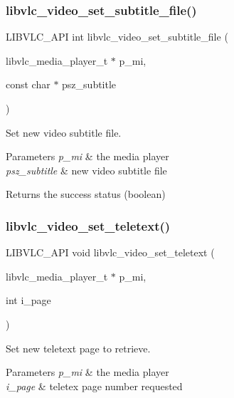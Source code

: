 \subsubsection{\texorpdfstring{libvlc\+\_\+video\+\_\+set\+\_\+subtitle\+\_\+file()}{libvlc\_video\_set\_subtitle\_file()}}
{\footnotesize\ttfamily L\+I\+B\+V\+L\+C\+\_\+\+A\+PI int libvlc\+\_\+video\+\_\+set\+\_\+subtitle\+\_\+file (\begin{DoxyParamCaption}\item[{libvlc\+\_\+media\+\_\+player\+\_\+t $\ast$}]{p\+\_\+mi,  }\item[{const char $\ast$}]{psz\+\_\+subtitle }\end{DoxyParamCaption})}

Set new video subtitle file.


\begin{DoxyParams}{Parameters}
{\em p\+\_\+mi} & the media player \\
\hline
{\em psz\+\_\+subtitle} & new video subtitle file \\
\hline
\end{DoxyParams}
\begin{DoxyReturn}{Returns}
the success status (boolean) 
\end{DoxyReturn}
\mbox{\label{group__libvlc__video_gac734df7211ebf2a80d09d2566c96240b}} 
\subsubsection{\texorpdfstring{libvlc\+\_\+video\+\_\+set\+\_\+teletext()}{libvlc\_video\_set\_teletext()}}
{\footnotesize\ttfamily L\+I\+B\+V\+L\+C\+\_\+\+A\+PI void libvlc\+\_\+video\+\_\+set\+\_\+teletext (\begin{DoxyParamCaption}\item[{libvlc\+\_\+media\+\_\+player\+\_\+t $\ast$}]{p\+\_\+mi,  }\item[{int}]{i\+\_\+page }\end{DoxyParamCaption})}

Set new teletext page to retrieve.


\begin{DoxyParams}{Parameters}
{\em p\+\_\+mi} & the media player \\
\hline
{\em i\+\_\+page} & teletex page number requested \\
\hline
\end{DoxyParams}
\mbox{\label{group__libvlc__video_ga8b8ee7e31c56b08b31958e92d3f41520}} 
